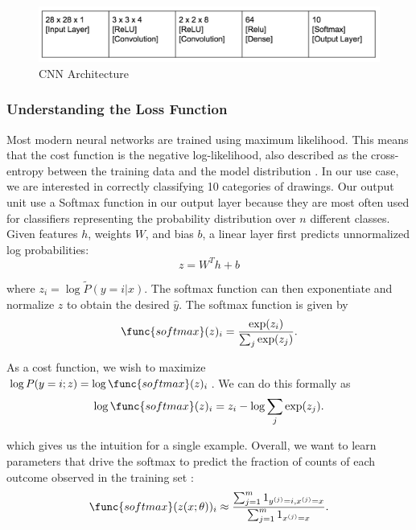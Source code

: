 \documentclass[12pt]{article}
\begin{document}
\begin{figure}
  \begin{center}
    \includegraphics[scale=0.5]{fig3}
    \end{center}
  \caption{CNN Architecture}
  \label{fig:cnnArch}
\end{figure}

\subsubsection{Understanding the Loss Function}

Most modern neural networks are trained using maximum likelihood. This
means that the cost function is the negative log-likelihood, also
described as the cross-entropy between the training data and the model
distribution \cite{Goodfellow-et-al-2016}. In our use case, we are interested
in correctly classifying 10 categories of drawings. Our output unit
use a Softmax function in our output layer because they are most often
used for classifiers representing the probability distribution over
$n$ different classes. Given features $h$, weights $W$, and bias $b$, a
linear layer first predicts unnormalized log probabilities:
\begin{equation}
  z = W^Th + b 
\end{equation}

where $z_i = \log \tilde{P}(y = i | x)$. The softmax function can then
exponentiate and normalize $z$ to obtain the desired $\hat{y}$. The
softmax function is given by
\begin{equation}
  \func{softmax}(z)_i = \frac{\exp(z_i)}{\sum_j \exp(z_j)}.
\end{equation}

As a cost function, we wish to maximize
$\log P(y=i; z) = \log \func{softmax}(z)_i$. We can do this formally as
\begin{equation}
  \log \func{softmax}(z)_i = z_i - \log \sum_j \exp(z_j).
\end{equation}

which gives us the intuition for a single example. Overall, we want to learn
parameters that drive the softmax to predict the fraction of counts of each
outcome observed in the training set \cite{Goodfellow-et-al-2016}:
\begin{equation}
  \func{softmax}(z(x;\theta))_i \approx \frac{\sum_{j=1}^m 1_{y^{(j)} = i,
      x^{(j)} = x}}{\sum_{j=1}^m 1_{x^{(j)} = x}}.
\end{equation}
\end{document}
